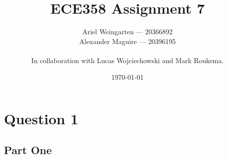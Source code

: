 \documentclass[a4paper]{article}
\title{ECE358 Assignment 7}
\author{Ariel Weingarten --- 20366892\\
        Alexander Maguire --- 20396195\\\\
        In collaboration with Lucas Wojciechowski and Mark Roukema.}
\date{\today}
\begin{document}
\maketitle

\section{Question 1}
\subsection{Part One}
\end{document}
